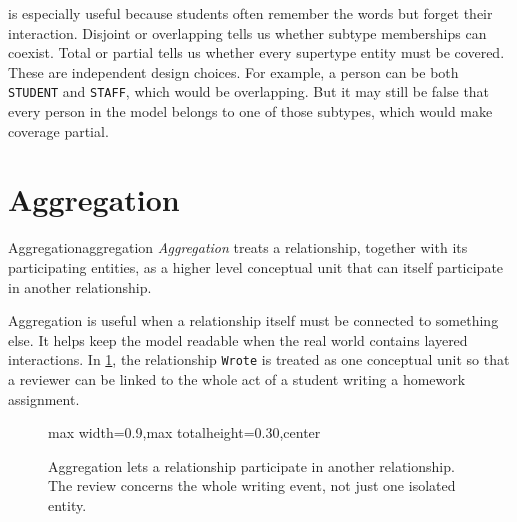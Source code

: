 \documentclass[11pt,a4paper,openany]{book}
\begin{document}
 is especially useful because students often remember the words but forget their interaction. Disjoint or overlapping tells us whether subtype memberships can coexist. Total or partial tells us whether every supertype entity must be covered. These are independent design choices. For example, a person can be both \texttt{STUDENT} and \texttt{STAFF}, which would be overlapping. But it may still be false that every person in the model belongs to one of those subtypes, which would make coverage partial.

\section{Aggregation}
\begin{definition}{Aggregation}{aggregation}
\emph{Aggregation} treats a relationship, together with its participating entities, as a higher level conceptual unit that can itself participate in another relationship.
\end{definition}

Aggregation is useful when a relationship itself must be connected to something else. It helps keep the model readable when the real world contains layered interactions. In \cref{fig:er-aggregation}, the relationship \texttt{Wrote} is treated as one conceptual unit so that a reviewer can be linked to the whole act of a student writing a homework assignment.

\begin{figure}[tbp]
\centering
\begin{adjustbox}{max width=0.9\linewidth,max totalheight=0.30\textheight,center}
\end{adjustbox}
\caption{Aggregation lets a relationship participate in another relationship. The review concerns the whole writing event, not just one isolated entity.}
\label{fig:er-aggregation}
\end{figure}
\end{document}

